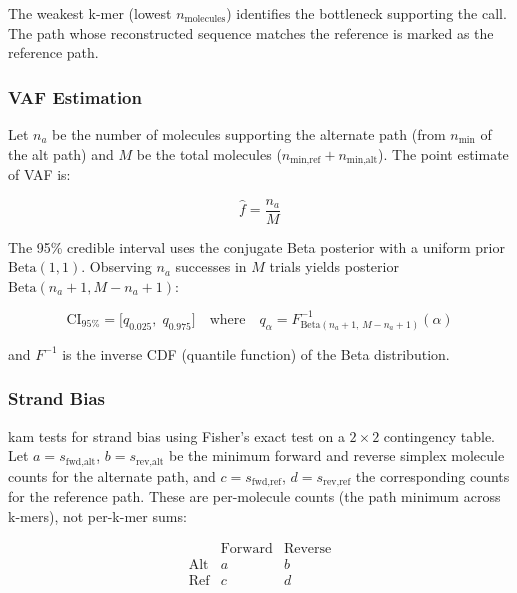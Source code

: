 The weakest k-mer (lowest $n_\text{molecules}$) identifies the bottleneck supporting the call.
The path whose reconstructed sequence matches the reference is marked as the reference path.

\subsubsection{VAF Estimation}

Let $n_a$ be the number of molecules supporting the alternate path (from $n_\text{min}$ of the alt path) and $M$ be the total molecules ($n_\text{min,ref} + n_\text{min,alt}$).
The point estimate of VAF is:

\begin{equation}
  \label{eq:vaf}
  \hat{f} = \frac{n_a}{M}
\end{equation}

The 95\% credible interval uses the conjugate Beta posterior with a uniform prior $\text{Beta}(1, 1)$.
Observing $n_a$ successes in $M$ trials yields posterior $\text{Beta}(n_a + 1, M - n_a + 1)$:

\begin{equation}
  \label{eq:vaf-ci}
  \text{CI}_{95\%} = \bigl[q_{0.025}, \; q_{0.975}\bigr]
  \quad \text{where} \quad
  q_\alpha = F^{-1}_{\text{Beta}(n_a+1, \, M-n_a+1)}(\alpha)
\end{equation}

\noindent and $F^{-1}$ is the inverse CDF (quantile function) of the Beta distribution.

\subsubsection{Strand Bias}

kam tests for strand bias using Fisher's exact test on a $2 \times 2$ contingency table.
Let $a = s_\text{fwd,alt}$, $b = s_\text{rev,alt}$ be the minimum forward and reverse simplex molecule counts for the alternate path, and $c = s_\text{fwd,ref}$, $d = s_\text{rev,ref}$ the corresponding counts for the reference path.
These are per-molecule counts (the path minimum across k-mers), not per-k-mer sums:

\begin{equation}
  \label{eq:strand-bias-table}
  \begin{array}{c|cc}
    & \text{Forward} & \text{Reverse} \\ \hline
    \text{Alt}  & a & b \\
    \text{Ref}  & c & d
  \end{array}
\end{equation}

